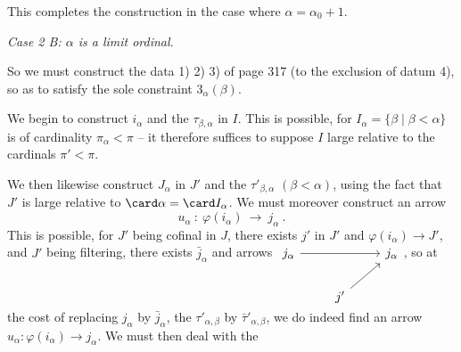 This completes the construction in the case where $\alpha=\alpha_0+1$.

\textit{Case 2 B: $\alpha$ is a limit ordinal.}

So we must construct the data 1) 2) 3) of page 317 (to the exclusion of datum 4), so as to satisfy the sole constraint $3_\alpha(\beta)$.

We begin to construct $i_\alpha$ and the $\tau_{\beta,\alpha}$ in $I$. This is possible, for $I_\alpha=\{\beta\mid\beta<\alpha\}$ is of cardinality $\pi_\alpha<\pi$ – it therefore suffices to suppose $I$ large relative to the cardinals $\pi'<\pi$.

We then likewise construct $J_\alpha$ in $J'$ and the $\tau'_{\beta,\alpha}$ $(\beta<\alpha)$, using the %
fact that $J'$ is large relative to $\card\alpha=\card I_\alpha$. We must moreover construct an arrow
\[
u_\alpha\ :\ \varphi(i_\alpha)\ \longrightarrow\ j_\alpha\ .
\]
This is possible, for $J'$ being cofinal in $J$, there exists $j'$ in $J'$ and $\varphi(i_\alpha)\longrightarrow J'$, and $J'$ being filtering, there exists $\bar{j}_\alpha$ and arrows %
$\begin{tikzcd}[ampersand replacement=\&, baseline=(\tikzcdmatrixname-1-1.base)]
j_\alpha \arrow[rr] \& \& j_\alpha \\
\& j' \arrow[ur] \&
\end{tikzcd}$, so at the cost of replacing $j_\alpha$ by $\bar{j}_\alpha$, the $\tau'_{\alpha,\beta}$ by $\bar{\tau}'_{\alpha,\beta}$, we do indeed find an arrow $u_\alpha:\varphi(i_\alpha)\longrightarrow j_\alpha$. We must then deal with the %
